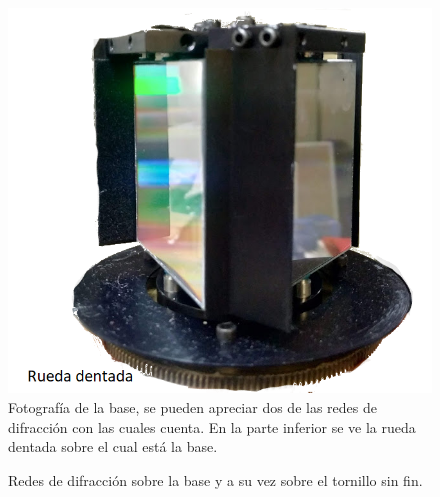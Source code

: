 \begin{figure}[h]
	\centering
	\includegraphics[width=0.4\linewidth,trim={0 0 0 20mm}]{Imagenes/3/baseRedes}
	\caption[Fotografía de la base del monocromador con 3 redes de difracción]{Fotografía de la base, se pueden apreciar dos de las redes de difracción con las cuales cuenta. En la parte inferior se ve la rueda dentada sobre el cual está la base.}
	\label{fig:baseredes}
\end{figure} 
\begin{figure}[h]
	\centering
	\hspace{10mm}
	\caption{Redes de difracción sobre la base y a su vez sobre el tornillo sin fin.}
	\label{fig:tornillo}
\end{figure}

